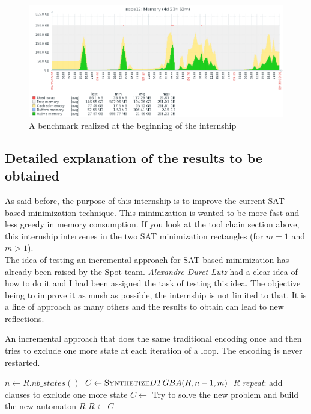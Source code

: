 \begin{figure}[H]
 \centering
 \includegraphics[scale=0.5]{img/over_memory.png}
 \caption{A benchmark realized at the beginning of the internship}
 \label{fig:over_memory}
\end{figure}

\subsection{Detailed explanation of the results to be obtained}
As said before, the purpose of this internship is to improve the current SAT-based minimization technique.
This minimization is wanted to be more fast and less greedy in memory consumption.
If you look at the tool chain section above, this internship intervenes in the two SAT minimization
rectangles (for $m=1$ and $m > 1$).\\

The idea of testing an incremental approach for SAT-based minimization has already been raised by the Spot
team. \textit{Alexandre Duret-Lutz} had a clear idea of how to do it and I had been assigned the task of
testing this idea. The objective being to improve it as mush as possible, the internship is not limited
to that. It is a line of approach as many others and the results to obtain can lead to new reflections.\\

\begin{algorithm}[H]
 \caption{An incremental approach that does the same traditional encoding once and then tries to exclude
          one more state at each iteration of a loop. The encoding is never restarted.}\label{naive}
 \begin{algorithmic}[1]
   \State $n \gets R.nb\_states() $
   \State $C \gets \textsc{Synthetize}DTGBA(R,n-1,m) $
    \Return $R$\EndIf
   \BState \emph{repeat}:
   \State add clauses to exclude one more state
   \State $C \gets$ Try to solve the new problem and build the new automaton
    \Return $R$\EndIf
   \State $R \gets C$
  \EndProcedure
 \end{algorithmic}
\end{algorithm}

